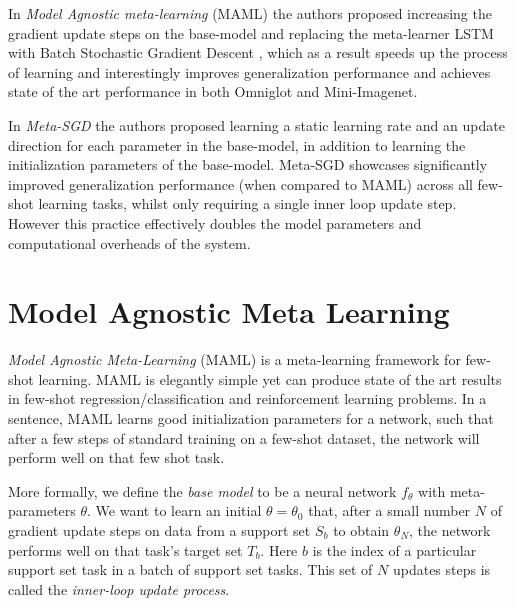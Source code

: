 \documentclass{article} \usepackage[dvipsnames]{xcolor}
\begin{document}
In \emph{Model Agnostic meta-learning} (MAML) \citep{finn2017model} the authors proposed increasing the gradient update steps on the base-model and replacing the meta-learner LSTM with Batch Stochastic Gradient Descent \citep{krizhevsky2012imagenet}, which as a result speeds up the process of learning and interestingly improves generalization performance and achieves state of the art performance in both Omniglot and Mini-Imagenet.

In \emph{Meta-SGD} \citep{li2017meta} the authors proposed learning a static learning rate and an update direction for each parameter in the base-model, in addition to learning the initialization parameters of the base-model. Meta-SGD showcases significantly improved generalization performance (when compared to MAML) across all few-shot learning tasks, whilst only requiring a single inner loop update step. However this practice effectively doubles the model parameters and computational overheads of the system.











\section{Model Agnostic Meta Learning}
\label{maml-definition}
\emph{Model Agnostic Meta-Learning} (MAML) \citep{finn2017model} is a meta-learning framework for few-shot learning. MAML is elegantly simple yet can produce state of the art results in few-shot regression/classification and reinforcement learning problems. In a sentence, MAML learns good initialization parameters for a network, such that after a few steps of standard training on a few-shot dataset, the network will perform well on that few shot task.


More formally, we define the \emph{base model} to be a neural network $f_\theta$ with meta-parameters $\theta$. We want to learn an initial $\theta=\theta_0$ that, after a small number $N$ of gradient update steps on data from a support set $S_{b}$ to obtain $\theta_N$, the network performs well on that task's target set $T_{b}$. Here $b$ is the index of a particular support set task in a batch of support set tasks.  This set of $N$ updates steps is called the \emph{inner-loop update process}.
\end{document}
